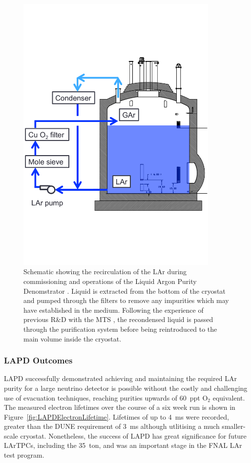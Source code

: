 \begin{figure}
  \centering
  \includegraphics[width=10cm]{LAPDLiquidCirculation.pdf}
  \caption[Schematic showing the recirculation of the LAr during commissioning and operations of the Liquid Argon Purity Denomstrator.]{Schematic showing the recirculation of the LAr during commissioning and operations of the Liquid Argon Purity Denomstrator \cite{LAPD2014}.  Liquid is extracted from the bottom of the cryostat and pumped through the filters to remove any impurities which may have established in the medium.  Following the experience of previous R\&D with the MTS \cite{MTS2009a}, the recondensed liquid is passed through the purification system before being reintroduced to the main volume inside the cryostat.}
  \label{fig:LAPDLiquidCirculation}
\end{figure}

\subsubsection{LAPD Outcomes}\label{sec:LAPDOutcomes}

LAPD successfully demonstrated achieving and maintaining the required LAr purity for a large neutrino detector is possible without the costly and challenging use of evacuation techniques, reaching purities upwards of 60~ppt O$_2$ equivalent.  The measured electron lifetimes over the course of a six week run is shown in Figure~\ref{fig:LAPDElectronLifetime}.  Lifetimes of up to 4~ms were recorded, greater than the DUNE requirement of 3~ms although utlitising a much smaller-scale cryostat.  Nonetheless, the success of LAPD has great significance for future LArTPCs, including the 35~ton, and was an important stage in the FNAL LAr test program.

